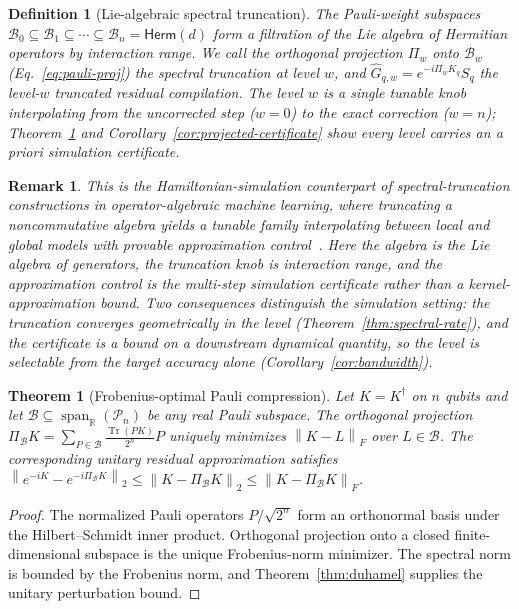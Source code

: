 \documentclass[aps,prxquantum,reprint,superscriptaddress,nofootinbib,amsmath,amssymb]{revtex4-2}
\newcommand{\norm}[1]{\left\lVert #1 \right\rVert}
\newcommand{\Tr}{\operatorname{Tr}}
\newcommand{\Span}{\operatorname{span}}
\newcommand{\cB}{\mathcal{B}}
\newcommand{\cP}{\mathcal{P}}
\newtheorem{theorem}{Theorem}
\newtheorem{definition}{Definition}
\newtheorem{remark}{Remark}
\begin{document}
\begin{definition}[Lie-algebraic spectral truncation]
\label{def:spectral-truncation}
The Pauli-weight subspaces $\cB_0\subseteq\cB_1\subseteq\cdots\subseteq\cB_n=\mathsf{Herm}(d)$ form a filtration of the Lie algebra of Hermitian operators by interaction range. We call the orthogonal projection $\Pi_w$ onto $\cB_w$ (Eq.~\eqref{eq:pauli-proj}) the \emph{spectral truncation at level $w$}, and $\widehat G_{q,w}=e^{-i\Pi_wK_q}S_q$ the level-$w$ truncated residual compilation. The level $w$ is a single tunable knob interpolating from the uncorrected step ($w=0$) to the exact correction ($w=n$); Theorem~\ref{thm:pauli-projection} and Corollary~\ref{cor:projected-certificate} show every level carries an \emph{a priori} simulation certificate.
\end{definition}

\begin{remark}
This is the Hamiltonian-simulation counterpart of spectral-truncation constructions in operator-algebraic machine learning, where truncating a noncommutative algebra yields a tunable family interpolating between local and global models with provable approximation control~\cite{hashimoto2024spectral,hashimoto2023rkhm}. Here the algebra is the Lie algebra of generators, the truncation knob is interaction range, and the approximation control is the multi-step simulation certificate rather than a kernel-approximation bound. Two consequences distinguish the simulation setting: the truncation converges \emph{geometrically} in the level (Theorem~\ref{thm:spectral-rate}), and the certificate is a bound on a downstream dynamical quantity, so the level is selectable from the target accuracy alone (Corollary~\ref{cor:bandwidth}).
\end{remark}

\begin{theorem}[Frobenius-optimal Pauli compression]
\label{thm:pauli-projection}
Let $K=K^\dagger$ on $n$ qubits and let $\cB\subseteq\Span_\mathbb{R}(\cP_n)$ be any real Pauli subspace. The orthogonal projection $\Pi_\cB K=\sum_{P\in\cB}\frac{\Tr(PK)}{2^n}P$ uniquely minimizes $\norm{K-L}_F$ over $L\in\cB$. The corresponding unitary residual approximation satisfies $\norm{e^{-iK}-e^{-i\Pi_\cB K}}_2\leq\norm{K-\Pi_\cB K}_2\leq\norm{K-\Pi_\cB K}_F$.
\end{theorem}

\begin{proof}
The normalized Pauli operators $P/\sqrt{2^n}$ form an orthonormal basis under the Hilbert--Schmidt inner product. Orthogonal projection onto a closed finite-dimensional subspace is the unique Frobenius-norm minimizer. The spectral norm is bounded by the Frobenius norm, and Theorem~\ref{thm:duhamel} supplies the unitary perturbation bound.
\end{proof}
\end{document}
